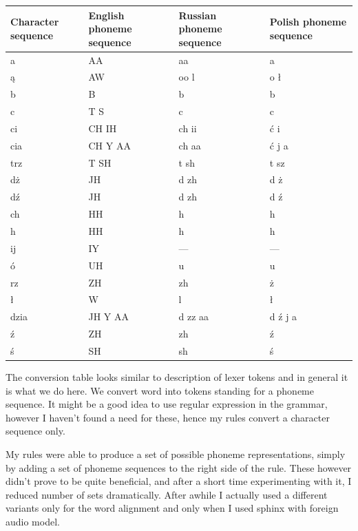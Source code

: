 \documentclass[12pt,a4paper,english]{article}
\begin{document}
\begin{center}
\begin{tabular}{| p{3.5cm} | p{3.5cm} | p{3.5cm} | p{3.3cm} |}
\hline
\rowcolor[gray]{0.8}
Character sequence & English phoneme sequence & Russian phoneme sequence & Polish phoneme sequence
\\ \hline
a & AA & aa & a
\\ \hline
ą & AW & oo l & o ł \footnotemark
\\ \hline
b & B & b & b
\\ \hline
c & T S & c & c
\\ \hline
ci & CH IH & ch ii & ć i
\\ \hline
cia & CH Y AA & ch aa & ć j a 
\\ \hline
trz & T SH & t sh & t sz
\\ \hline
dż & JH & d zh & d ż
\\ \hline
dź & JH & d zh & d ź
\\ \hline
ch & HH & h & h
\\ \hline
h & HH & h & h
\\ \hline
ij & IY & --- & ---
\\ \hline
ó & UH & u & u
\\ \hline
rz & ZH & zh & ż
\\ \hline
ł & W & l & ł
\\ \hline
dzia & JH Y AA & d zz aa & d ź j a
\\ \hline
ź & ZH & zh & ź
\\ \hline
ś & SH & sh & ś
\\ \hline
\end{tabular}
\end{center}

\newpage

The conversion table looks similar to description of lexer tokens and in general it is what we do here. We convert word into tokens standing for a phoneme sequence. It might be a good idea to use regular expression in the grammar, however I haven't found a need for these, hence my rules convert a character sequence only. \newline

My rules were able to produce a set of possible phoneme representations, simply by adding a set of phoneme sequences to the right side of the rule. These however didn't prove to be quite beneficial, and after a short time experimenting with it, I reduced number of sets dramatically. After awhile I actually used a different variants only for the word alignment and only when I used sphinx with foreign audio model. \newline
\end{document}
